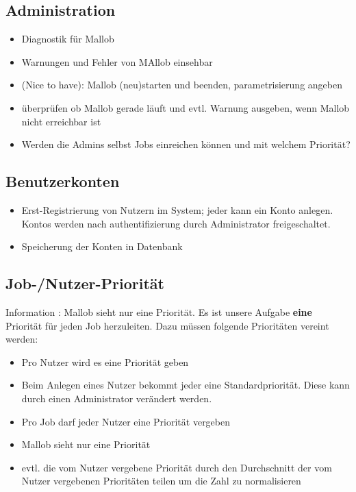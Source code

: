 \documentclass{article}
\begin{document}
\subsection{Administration}
\begin{itemize}
    \item Diagnostik für Mallob
    \item Warnungen und Fehler von MAllob einsehbar
    \item (Nice to have): Mallob (neu)starten und beenden, parametrisierung angeben
    \item überprüfen ob Mallob gerade läuft und evtl. Warnung ausgeben, wenn Mallob nicht erreichbar ist
    
    \item Werden die Admins selbst Jobs einreichen können und mit welchem Priorität?
\end{itemize}


\subsection{Benutzerkonten}

\begin{itemize}
    \item Erst-Registrierung von Nutzern im System; jeder kann ein Konto anlegen. Kontos werden nach authentifizierung durch Administrator freigeschaltet.
    \item Speicherung der Konten in Datenbank
\end{itemize}



\subsection{Job-/Nutzer-Priorität}
Information : Mallob sieht nur eine Priorität. Es ist unsere Aufgabe \textbf{eine} Priorität für jeden Job herzuleiten. Dazu müssen folgende Prioritäten vereint werden: 
\begin{itemize}
    \item Pro Nutzer wird es eine Priorität geben 
    \item Beim Anlegen eines Nutzer bekommt jeder eine Standardpriorität. Diese kann durch einen Administrator verändert werden.
    \item Pro Job darf jeder Nutzer eine Priorität vergeben
    \item Mallob sieht nur eine Priorität
    \item evtl. die vom Nutzer vergebene Priorität durch den Durchschnitt der vom Nutzer vergebenen Prioritäten teilen um die Zahl zu normalisieren
\end{itemize}
\end{document}
